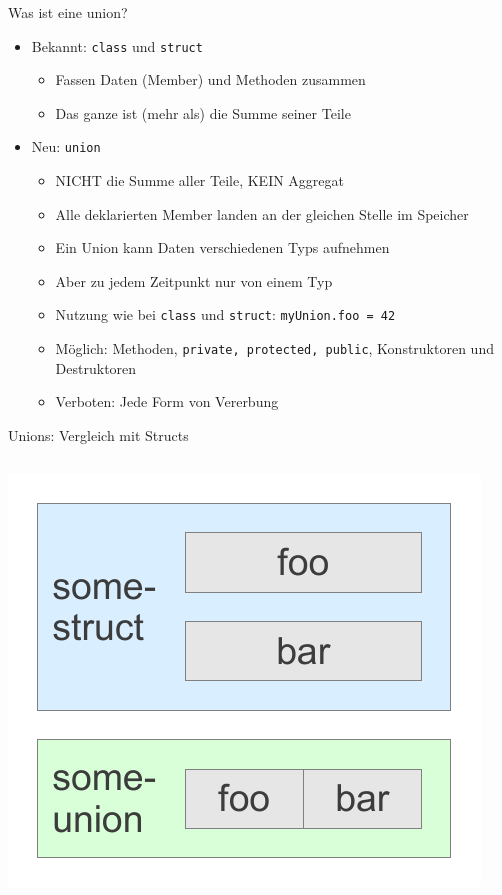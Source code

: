 \begin{frame}[fragile]{Was ist eine union?}
	\begin{itemize}
		\item Bekannt: \verb|class| und \verb|struct|
		\begin{itemize}
			\item Fassen Daten (Member) und Methoden zusammen
			\item Das ganze ist (mehr als) die Summe seiner Teile
		\end{itemize}
		\pause
		\item Neu: \verb|union|
		\begin{itemize}
			\item NICHT die Summe aller Teile, KEIN Aggregat
			\item Alle deklarierten Member landen an der gleichen Stelle im Speicher
			\item Ein Union kann Daten verschiedenen Typs aufnehmen
			\item Aber zu jedem Zeitpunkt nur von einem Typ
			\item Nutzung wie bei \verb|class| und \verb|struct|: \verb|myUnion.foo = 42|
			\item Möglich: Methoden, \verb|private, protected, public|, Konstruktoren und Destruktoren
			\item Verboten: Jede Form von Vererbung
		\end{itemize}
	\end{itemize}
\end{frame}

\begin{frame}[fragile]{Unions: Vergleich mit Structs}
	\begin{columns}
			
			
			\includegraphics[width=\linewidth]{images/structunion.pdf}
	\end{columns}
\end{frame}


